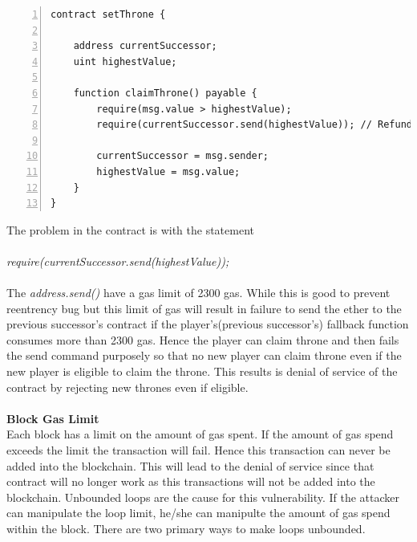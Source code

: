 \documentclass{article}
\begin{document}
\begin{Verbatim}[numbers=left,xleftmargin=5mm]
contract setThrone {
    
    address currentSuccessor;
    uint highestValue;

    function claimThrone() payable {
        require(msg.value > highestValue);
        require(currentSuccessor.send(highestValue)); // Refund the old Successor else revert

        currentSuccessor = msg.sender;
        highestValue = msg.value;
    }
}
\end{Verbatim}
The problem in the contract is with the statement\\
\\
\emph{require(currentSuccessor.send(highestValue));}\\
\\
The \emph{address.send()} have a gas limit of 2300 gas. While this is good to prevent reentrency bug but this limit of gas will result in failure to send the ether to the previous successor's contract if the player's(previous successor's) fallback function consumes more than 2300 gas. Hence the player can claim throne and then fails the send command purposely so that no new player can claim throne even if the new player is eligible to claim the throne. This results is denial of service of the contract by rejecting new thrones even if eligible.\\
\\
\textbf{Block Gas Limit}\\
Each block has a limit on the amount of gas spent. If the amount of gas spend exceeds the limit the transaction will fail. Hence this transaction can never be added into the blockchain. This will lead to the denial of service since that contract will no longer work as this transactions will not be added into the blockchain. Unbounded loops are the cause for this vulnerability. If the attacker can manipulate the loop limit, he/she can manipulte the amount of gas spend within the block. There are two primary ways to make loops unbounded.\\
\end{document}
